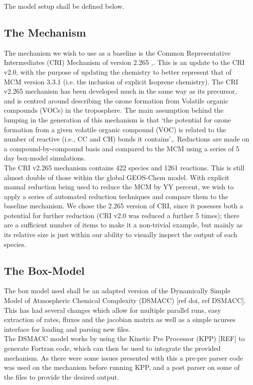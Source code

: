 The model setup shall be defined below. 

\subsection{The Mechanism}
The mechanism we wish to use as a baseline is the Common Representative Intermediates (CRI) Mechanism of version 2.265 ,\cite{criv2}. This is an update to the CRI v2.0, with the purpose of updating the chemistry to better represent that of MCM version 3.3.1 (i.e. the inclusion of explicit Isoprene chemistry). The CRI v2.265 mechanism has been developed much in the same way as its precursor, and is centred around describing the ozone formation from Volatile organic compounds (VOCs) in the troposphere. The main assumption behind the lumping in the generation of this mechanism is that `the potential for ozone formation from a given volatile organic compound (VOC) is related to the number of reactive (i.e., CC and CH) bonds it contains',\cite{cri}. Reductions are made on a compound-by-compound basis and compared to the MCM using a series of 5 day box-model simulations. \\

The CRI v2.265 mechanism contains 422 species and 1261 reactions. This is still almost double of those within the global GEOS-Chem model. With explicit manual reduction being used to reduce the MCM by YY percent, we wish to apply a series of automated reduction techniques and compare them to the baseline mechanism. We chose the 2.265 version of CRI, since it posesses both a potential for further reduction (CRI v2.0 was reduced a further 5 times); there are a sufficient number of items to make it a non-trivial example, but mainly as its relative size is just within our ability to visually inspect the output of each species. 

\subsection{The Box-Model}
The box model used shall be an adapted version of the Dynamically Simple Model of Atmospheric Chemical Complexity (DSMACC) [ref doi, ref DSMACC]. This has had several changes which allow for multiple parallel runs, easy extraction of rates, fluxes and the jacobian matrix as well as a simple ncurses interface for loading and parsing new files. \\

The DSMACC model works by using the Kinetic Pre Processor (KPP) [REF] to generate Fortran code, which can then be used to integrate the provided mechanism. As there were some issues presented with this a pre-pre parser code was used on the mechanism before running KPP, and a post parser on some of the files to provide the desired output. 

